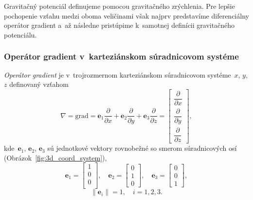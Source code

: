 \documentclass[a4paper,12pt]{book}
\newcommand{\grad}{\mathrm{grad}}
\let\vec\mathbf
\begin{document}
Gravitačný potenciál definujeme pomocou gravitačného zrýchlenia.  Pre lepšie 
pochopenie vzťahu medzi oboma veličinami však najprv predstavíme diferenciálny 
operátor gradient a~až následne pristúpime k~samotnej definícii gravitačného 
potenciálu.

\subsubsection{Operátor gradient v~karteziánskom súradnicovom systéme}
\label{sec:gradient}

\emph{Operátor gradient} je v~trojrozmernom karteziánskom súradnicovom 
systéme~$x$, $y$, $z$ definovaný vzťahom
%
\begin{equation}
\label{eq:gradient}
\nabla = \grad = \vec e_1 \frac{\partial}{\partial x} + \vec e_2
\frac{\partial}{\partial y} + \vec e_3 \frac{\partial}{\partial z} =
\begin{bmatrix}
\dfrac{\partial}{\partial x} \\[2ex]
\dfrac{\partial}{\partial y} \\[2ex]
\dfrac{\partial}{\partial z}
\end{bmatrix}
{,}
\end{equation}
%
kde~$\vec e_1$, $\vec e_2$, $\vec e_3$ sú jednotkové vektory
rovnobežné so smerom súradnicových osí (Obrázok~\ref{fig:3d_coord_system}),
%
\begin{equation}
\label{eq:unit_vectors}
\vec e_1 =
\begin{bmatrix}
1\\
0\\
0\\
\end{bmatrix}
{,} \quad
%
\vec e_2 =
\begin{bmatrix}
0\\
1\\
0
\end{bmatrix}
%
{,}\quad
%
\vec e_3 =
\begin{bmatrix}
0\\
0\\
1
\end{bmatrix}
{,}
\end{equation}
%
\begin{equation}
\label{eq:unit_vectors_unit_length}
\| \vec e_i \| = 1{,} \quad i = 1, 2,3{.}
\end{equation}
\end{document}
